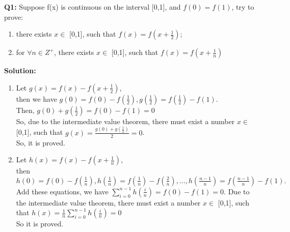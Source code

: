 \documentclass[a4paper,10pt,nil]{article}
\begin{document}
 \begin{spacing}{1.5}

\textbf{Q1:} Suppose f(x) is continuous on the interval [0,1], and $f(0)=f(1)$, try to prove:
\begin{enumerate}[(1)]
\item there exists $x \in$ [0,1], such that $f(x)=f(x+\frac{1}{2})$;
\item for $\forall n\in Z^+$, there exists $x \in$ [0,1], such that $f(x)=f(x+\frac{1}{n})$
\end{enumerate}

\textbf{Solution:}
\begin{enumerate}[(1)] 
\item Let $g(x)=f(x)-f(x+\frac{1}{2})$,\\ then we have $g(0)=f(0)-f(\frac{1}{2}), g(\frac{1}{2})=f(\frac{1}{2})-f(1)$.\\ Then, $g(0)+g(\frac{1}{2})=f(0)-f(1)=0$\\
So, due to the intermediate value theorem, there must exist a number $x \in$ [0,1], such that $g(x)=\frac{g(0)+g(\frac{1}{2})}{2}=0$. \\
So, it is proved.
\item Let $h(x)=f(x)-f(x+\frac{1}{n})$,\\ then $h(0)=f(0)-f(\frac{1}{n}),h(\frac{1}{n})=f(\frac{1}{n})-f(\frac{2}{n}),...,h(\frac{n-1}{n})=f(\frac{n-1}{n})-f(1).$\\
Add these equations, we have $\sum_{i=0}^{n-1}h(\frac{i}{n})=f(0)-f(1)=0.$
Due to the intermediate value theorem, there must exist a number $x \in$ [0,1], such that $h(x)=\frac{1}{n}\sum_{i=0}^{n-1}h(\frac{i}{n})=0$ \\
So it is proved.
\end{enumerate}

\end{spacing}
\end{document}

